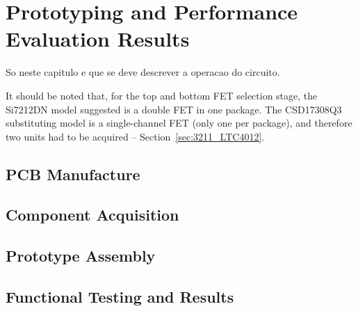 

\chapter{Prototyping and Performance Evaluation Results}\label{cha:chapter4_PrototypingPerf}

So neste capitulo e que se deve descrever a operacao do circuito.

It should be noted that, for the top and bottom FET selection stage, the Si7212DN model suggested is a double FET in one package. The CSD17308Q3 substituting model is a single-channel FET (only one per package), and therefore two units had to be acquired -- Section~\ref{sec:3211_LTC4012}.

\section{PCB Manufacture}\label{sec:41_PCBmanufacture}

\section{Component Acquisition}\label{sec:42_ComponentAcquisition}


\section{Prototype Assembly}\label{sec:43_PrototypeAssembly}

\section{Functional Testing and Results}\label{sec:44_FunctionalTesting}